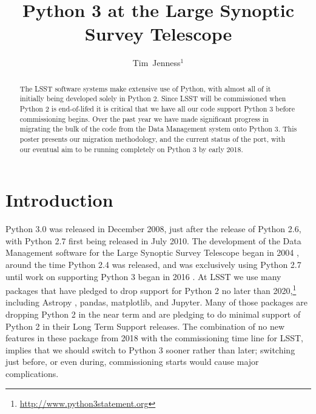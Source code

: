 \documentclass[11pt,twoside]{article}
\begin{document}
\title{Python 3 at the Large Synoptic Survey Telescope}

\author{Tim~Jenness$^1$
}


\begin{abstract}
  The LSST software systems make extensive use of Python, with almost all of it initially being developed solely in Python 2.
  Since LSST will be commissioned when Python 2 is end-of-lifed it is critical that we have all our code support Python 3 before commissioning begins.
  Over the past year we have made significant progress in migrating the bulk of the code from the Data Management system onto Python 3.
  This poster presents our migration methodology, and the current status of the port, with our eventual aim to be running completely on Python 3 by early 2018.
\end{abstract}

\section{Introduction}

Python 3.0 was released in December 2008, just after the release of Python 2.6, with Python 2.7 first being released in July 2010.
The development of the Data Management software for the Large Synoptic Survey Telescope \citep[LSST;][]{2008arXiv0805.2366I} began in 2004 \citep{2004AAS...20510811A}, around the time Python 2.4 was released, and was exclusively using Python 2.7 until work on supporting Python 3 began in 2016 \citep{P6-12_adassxxvi}.
At LSST we use many packages that have pledged to drop support for Python 2 no later than 2020,\footnote{\url{http://www.python3statement.org}} including Astropy \citep{2013A&A...558A..33A}, pandas, matplotlib, and Jupyter.
Many of those packages are dropping Python 2 in the near term and are pledging to do minimal support of Python 2 in their Long Term Support releases.
The combination of no new features in these package from 2018 with the commissioning time line for LSST, implies that we should switch to Python 3 sooner rather than later; switching just before, or even during, commissioning starts would cause major complications.
\end{document}
